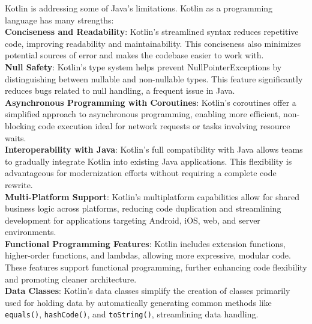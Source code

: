 \vspace{1cm}

\noindent Kotlin is addressing some of Java's limitations. Kotlin as a programming language has many strengths:
\\
\textbf{Conciseness and Readability}: Kotlin’s streamlined syntax reduces repetitive code, improving readability and maintainability. This conciseness also minimizes potential sources of error and makes the codebase easier to work with.
\\
\textbf{Null Safety}: Kotlin’s type system helps prevent NullPointerExceptions by distinguishing between nullable and non-nullable types. This feature significantly reduces bugs related to null handling, a frequent issue in Java.
\\
\textbf{Asynchronous Programming with Coroutines}: Kotlin’s coroutines offer a simplified approach to asynchronous programming, enabling more efficient, non-blocking code execution ideal for network requests or tasks involving resource waits.
\\
\textbf{Interoperability with Java}: Kotlin’s full compatibility with Java allows teams to gradually integrate Kotlin into existing Java applications. This flexibility is advantageous for modernization efforts without requiring a complete code rewrite.
\\
\textbf{Multi-Platform Support}: Kotlin’s multiplatform capabilities allow for shared business logic across platforms, reducing code duplication and streamlining development for applications targeting Android, iOS, web, and server environments.
\\
\textbf{Functional Programming Features}: Kotlin includes extension functions, higher-order functions, and lambdas, allowing more expressive, modular code. These features support functional programming, further enhancing code flexibility and promoting cleaner architecture.
\\
\textbf{Data Classes}: Kotlin’s data classes simplify the creation of classes primarily used for holding data by automatically generating common methods like \texttt{equals()}, \texttt{hashCode()}, and \texttt{toString()}, streamlining data handling.


